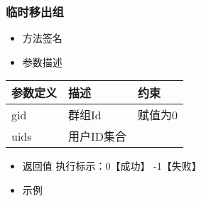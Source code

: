 \documentclass[letterpaper,10pt,english]{sphinxmanual}
\begin{document}
\subsubsection{临时移出组}
\label{\detokenize{csharp:id70}}\begin{itemize}
\item {} 
方法签名

\end{itemize}

%
\begin{sphinxVerbatim}[commandchars=\\\{\}]
    \PYG{p}{[}\PYG{p}{]} 
\end{sphinxVerbatim}
\begin{itemize}
\item {} 
参数描述

\end{itemize}


\begin{savenotes}\sphinxattablestart
\centering
\begin{tabulary}{\linewidth}[t]{|T|T|T|}
\hline
\sphinxstyletheadfamily 
参数定义
&\sphinxstyletheadfamily 
描述
&\sphinxstyletheadfamily 
约束
\\
\hline
gid
&
群组Id
&
赋值为0
\\
\hline
uids
&
用户ID集合
&
\textendash{}
\\
\hline
\end{tabulary}
\par
\sphinxattableend\end{savenotes}
\begin{itemize}
\item {} 
返回值 执行标示：0【成功】 -1【失败】

\item {} 
示例

\end{itemize}

%
\begin{sphinxVerbatim}[commandchars=\\\{\}]
   
   \PYG{p}{[}\PYG{p}{]}   
 
\end{sphinxVerbatim}
\end{document}
